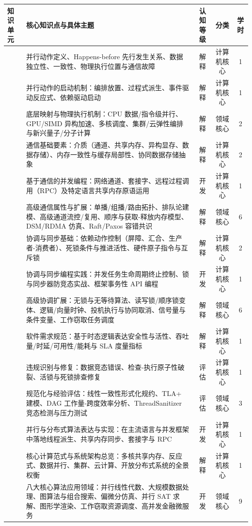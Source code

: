 \begin{strip}
\begingroup
{}\renewcommand{\arraystretch}{0.90}\setlength{\tabcolsep}{3pt}
\noindent\begin{tabularx}{\textwidth}{p{} Y c c c}
\toprule
\textbf{知识单元} & \textbf{核心知识点与具体主题} & \textbf{认知等级} & \textbf{分类} & \textbf{学时} \\
\midrule
{} 
& 并行动作定义、Happens-before 先行发生关系、数据独立性、一致性、物理执行位置与通信故障 & 解释 & 计算机核心 & 1 \\
& 并行动作的启动机制：编排放置、过程式派生、事件驱动反应式、依赖驱动启动 & 解释 & 计算机核心 & 1 \\
& 底层映射与物理执行机制：CPU 数据/指令级并行、GPU/SIMD 异构加速、多核调度、集群/云弹性编排与新兴量子/分子计算 & 解释 & 领域核心 & 2 \\
\midrule
{} 
& 通信基础要素：介质（通道、共享内存、异构显存、数据存储）、内存一致性与缓存局部性、协同数据存储抽象 & 解释 & 计算机核心 & 2 \\
& 基于通信的并发编程：网络通道、套接字、远程过程调用（RPC）及特定语言共享内存原语运用 & 开发 & 计算机核心 & 1 \\
& 高级通信属性与扩展：单播/组播/路由拓扑、排队论建模、高级通道流控/复用、顺序与获取-释放内存模型、DSM/RDMA 仿真、Raft/Paxos 容错共识 & 解释 & 领域核心 & 6 \\
\midrule
{} 
& 协调与同步基础：依赖动作控制（屏障、汇合、生产者-消费者）、死锁条件与推进活性、硬件原子指令与互斥锁 & 解释 & 计算机核心 & 2 \\
& 协调与同步编程实践：并发任务生命周期终止控制、锁与同步器防竞态实战、框架事务性 API 编程 & 开发 & 计算机核心 & 1 \\
& 高级协调扩展：无锁与无等待算法、读写锁/顺序锁变体、逻辑/向量时钟、投机执行与协同取消、信号量与条件变量、工作窃取任务调度 & 解释 & 领域核心 & 6 \\
\midrule
{} 
& 软件需求规范：基于时态逻辑表达安全性与活性、吞吐量/时延/可用性/能耗与 SLA 度量指标 & 解释 & 计算机核心 & 1 \\
& 违规识别与修复：数据竞态错误、检查-执行原子性破裂、活锁与死锁排查修复 & 评估 & 计算机核心 & 1 \\
& 规范化与经验评估：线性一致性形式化规约、TLA+ 建模、DAG 工作量-跨度效率分析、ThreadSanitizer 竞态检测与压力测试 & 评估 & 领域核心 & 3 \\
\midrule
{} 
& 并行与分布式算法表达与实现：在主流语言与并发框架中落地线程派生、共享内存同步、套接字与 RPC & 开发 & 计算机核心 & 1 \\
& 核心计算范式与系统架构总览：多核共享内存、反应式、数据并行、集群、云计算、开放分布式系统的全景权衡 & 解释 & 计算机核心 & 1 \\
& 八大核心算法应用领域：并行线性代数、大规模数据处理、图算法与组合搜索、偏微分仿真、并行 SAT 求解、图形学渲染、工作窃取资源调度、高并发金融微服务 & 开发 & 领域核心 & 9 \\
\bottomrule
\end{tabularx}
\endgroup
\end{strip}
